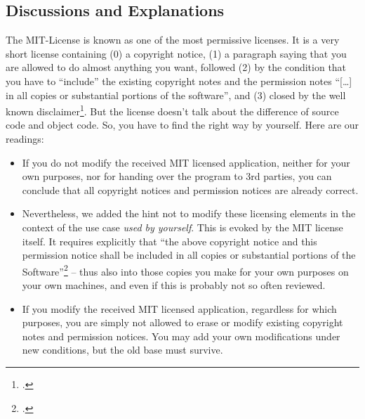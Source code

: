 \subsection{Discussions and Explanations}

The MIT-License is known as one of the most permissive licenses. It is a very
short license containing (0) a copyright notice, (1) a paragraph saying that you
are allowed to do almost anything you want, followed (2) by the condition that
you have to \enquote{include} the existing copyright notes and the permission
notes \enquote{[\ldots] in all copies or substantial portions of the software},
and (3) closed by the well known disclaimer\footcite[cf.][\nopage
wp]{MitLicense2012a}. But the license doesn't talk about the difference of
source code and object code. So, you have to find the right way by yourself.
Here are our readings:

\label{sec:MitDiscussions}
\begin{itemize}
  \item If you do not modify the received MIT licensed application, neither for
  your own purposes, nor for handing over the program to 3rd parties, you can
  conclude that all copyright notices and permission notices are already
  correct.
  \item Nevertheless, we added the hint not to modify these licensing elements
  in the context of the use case \emph{used by yourself}. This is evoked by the
  MIT license itself. It requires explicitly that \enquote{the above copyright
  notice and this permission notice shall be included in all copies or
  substantial portions of the Software}\footcite[cf.][\nopage
  wp]{MitLicense2012a} -- thus also into those copies you make for your own
  purposes on your own machines, and even if this is probably not so often
  reviewed.
  \item If you modify the received MIT licensed application, regardless for
  which purposes, you are simply not allowed to erase or modify existing
  copyright notes and permission notices. You may add your own modifications
  under new conditions, but the old base must survive.
\end{itemize}

%
